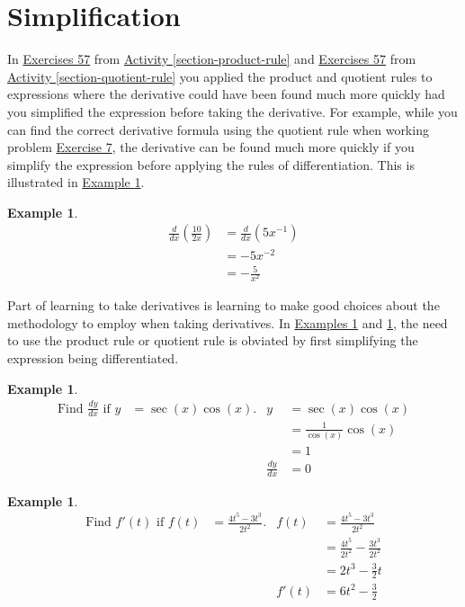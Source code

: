 \documentclass[10pt,oneside,]{book}
\theoremstyle{plain}
\theoremstyle{definition}
\newtheorem{example}[theorem]{Example}
\numberwithin{equation}{section}
\newcommand{\fe}[2]{#1\mathopen{}\left(#2\right)\mathclose{}}
\newcommand{\fd}[1]{#1'}
\newcommand{\lz}[2]{\frac{d#1}{d#2}}
\newcommand{\lzoo}[2]{{\frac{d}{d#1}}{\left(#2\right)}}
\begin{document}
\section[Simplification]{Simplification}\label{section-simplification}
In \hyperlink{unsimplified-product-first}{Exercises 5}\textendash{}\hyperlink{unsimplified-product-last}{7} from \hyperref[section-product-rule]{Activity \ref{section-product-rule}} and \hyperlink{unsimplified-quotient-first}{Exercises 5}\textendash{}\hyperlink{unsimplified-quotient-last}{7} from \hyperref[section-quotient-rule]{Activity \ref{section-quotient-rule}} you applied the product and quotient rules to expressions where the derivative could have been found much more quickly had you simplified the expression before taking the derivative.  For example, while you can find the correct derivative formula using the quotient rule when working problem \hyperlink{unsimplified-quotient-last}{Exercise 7}, the derivative can be found much more quickly if you simplify the expression before applying the rules of differentiation. This is illustrated in \hyperref[example-simplify-first]{Example \ref{example-simplify-first}}.%
\begin{example}\label{example-simplify-first}
\begin{align*}
\lzoo{x}{\frac{10}{2x}}&=\lzoo{x}{5x^{-1}}\\
&=-5x^{-2}\\
&=-\frac{5}{x^{2}}
\end{align*}%
\end{example}
\par
Part of learning to take derivatives is learning  to make good choices about the methodology to employ when taking derivatives.  In \hyperref[example-simplify-second]{Examples \ref{example-simplify-second}} and \hyperref[example-simplify-third]{\ref{example-simplify-third}}, the need to use the product rule or quotient rule is obviated by first simplifying the expression being differentiated.%
\begin{example}\label{example-simplify-second}
\begin{align*}
\text{Find }\lz{y}{x}\text{ if }y&=\fe{\sec}{x}\fe{\cos}{x}\text{.}&y&=\fe{\sec}{x}\fe{\cos}{x}\\
&&&=\frac{1}{\fe{\cos}{x}}\fe{\cos}{x}\\
&&&=1\\
&&\lz{y}{x}&=0
\end{align*}%
\end{example}
\begin{example}\label{example-simplify-third}
\begin{align*}
\text{Find }\fe{\fd{f}}{t}\text{ if }\fe{f}{t}&=\frac{4t^5-3t^3}{2t^2}\text{.}&\fe{f}{t}&=\frac{4t^5-3t^3}{2t^2}\\
&&&=\frac{4t^5}{2t^2}-\frac{3t^3}{2t^2}\\
&&&=2t^3-\frac{3}{2}t\\
&&\fe{\fd{f}}{t}&=6t^2-\frac{3}{2}
\end{align*}%
\end{example}
\typeout{************************************************}
\typeout{************************************************}
\end{document}
